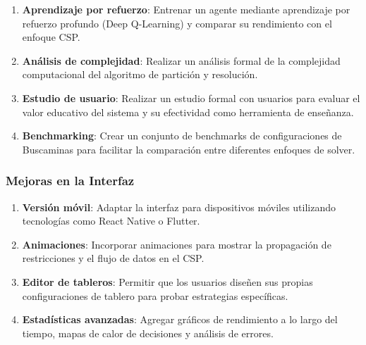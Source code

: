 \documentclass[12pt,a4paper]{article}
\begin{document}
\begin{enumerate}[itemsep=2pt]
    \item \textbf{Aprendizaje por refuerzo}: Entrenar un agente mediante aprendizaje por refuerzo profundo (Deep Q-Learning) y comparar su rendimiento con el enfoque CSP.

    \item \textbf{Análisis de complejidad}: Realizar un análisis formal de la complejidad computacional del algoritmo de partición y resolución.

    \item \textbf{Estudio de usuario}: Realizar un estudio formal con usuarios para evaluar el valor educativo del sistema y su efectividad como herramienta de enseñanza.

    \item \textbf{Benchmarking}: Crear un conjunto de benchmarks de configuraciones de Buscaminas para facilitar la comparación entre diferentes enfoques de solver.
\end{enumerate}

\subsubsection{Mejoras en la Interfaz}

\begin{enumerate}[itemsep=2pt]
    \item \textbf{Versión móvil}: Adaptar la interfaz para dispositivos móviles utilizando tecnologías como React Native o Flutter.

    \item \textbf{Animaciones}: Incorporar animaciones para mostrar la propagación de restricciones y el flujo de datos en el CSP.

    \item \textbf{Editor de tableros}: Permitir que los usuarios diseñen sus propias configuraciones de tablero para probar estrategias específicas.

    \item \textbf{Estadísticas avanzadas}: Agregar gráficos de rendimiento a lo largo del tiempo, mapas de calor de decisiones y análisis de errores.
\end{enumerate}
\end{document}
